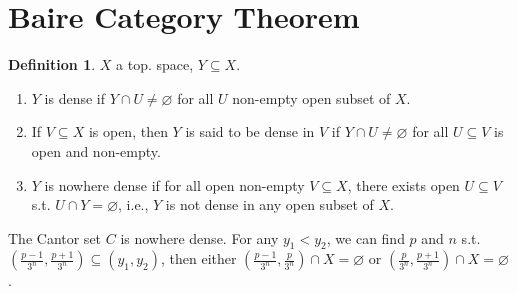 \documentclass{article}
\theoremstyle{definition}
\newtheorem{defn}{Definition}[section]
\theoremstyle{remark}
\theoremstyle{plain}
\begin{document}
\section{Baire Category Theorem}
\begin{defn}
    $X$ a top. space, $Y\subseteq X$.
    \begin{enumerate}[(1)]
        \item $Y$ is dense if $Y\cap U\neq\varnothing$ for all $U$ non-empty open subset of $X$.
        \item If $V\subseteq X$ is open, then $Y$ is said to be dense in $V$ if $Y\cap U\neq\varnothing$ for all $U\subseteq V$ is open and non-empty.
        \item $Y$ is nowhere dense if for all open non-empty $V\subseteq X$, there exists open $U\subseteq V$ s.t. $U\cap Y=\varnothing$, i.e., $Y$ is not dense in any open subset of $X$.
    \end{enumerate}
\end{defn}
The Cantor set $C$ is nowhere dense. For any $y_1<y_2$, we can find $p$ and $n$ s.t. $(\frac{p-1}{3^n},\frac{p+1}{3^n})\subseteq (y_1,y_2)$, then either $(\frac{p-1}{3^n},\frac{p}{3^n})\cap X=\varnothing$ or $(\frac{p}{3^n},\frac{p+1}{3^n})\cap X=\varnothing$.
\end{document}
